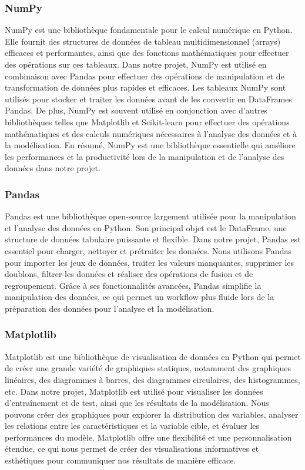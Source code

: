\subsubsection{NumPy}
NumPy est une bibliothèque fondamentale pour le calcul numérique en Python. Elle fournit des structures de données de tableau multidimensionnel (arrays) efficaces et performantes, ainsi que des fonctions mathématiques pour effectuer des opérations sur ces tableaux. Dans notre projet, NumPy est utilisé en combinaison avec Pandas pour effectuer des opérations de manipulation et de transformation de données plus rapides et efficaces. Les tableaux NumPy sont utilisés pour stocker et traiter les données avant de les convertir en DataFrames Pandas. De plus, NumPy est souvent utilisé en conjonction avec d'autres bibliothèques telles que Matplotlib et Scikit-learn pour effectuer des opérations mathématiques et des calculs numériques nécessaires à l'analyse des données et à la modélisation. En résumé, NumPy est une bibliothèque essentielle qui améliore les performances et la productivité lors de la manipulation et de l'analyse des données dans notre projet.

\subsubsection{Pandas}
Pandas est une bibliothèque open-source largement utilisée pour la manipulation et l'analyse des données en Python. Son principal objet est le DataFrame, une structure de données tabulaire puissante et flexible. Dans notre projet, Pandas est essentiel pour charger, nettoyer et prétraiter les données. Nous utilisons Pandas pour importer les jeux de données, traiter les valeurs manquantes, supprimer les doublons, filtrer les données et réaliser des opérations de fusion et de regroupement. Grâce à ses fonctionnalités avancées, Pandas simplifie la manipulation des données, ce qui permet un workflow plus fluide lors de la préparation des données pour l'analyse et la modélisation.

\subsubsection{Matplotlib}
Matplotlib est une bibliothèque de visualisation de données en Python qui permet de créer une grande variété de graphiques statiques, notamment des graphiques linéaires, des diagrammes à barres, des diagrammes circulaires, des histogrammes, etc. Dans notre projet, Matplotlib est utilisé pour visualiser les données d'entraînement et de test, ainsi que les résultats de la modélisation. Nous pouvons créer des graphiques pour explorer la distribution des variables, analyser les relations entre les caractéristiques et la variable cible, et évaluer les performances du modèle. Matplotlib offre une flexibilité et une personnalisation étendue, ce qui nous permet de créer des visualisations informatives et esthétiques pour communiquer nos résultats de manière efficace.

